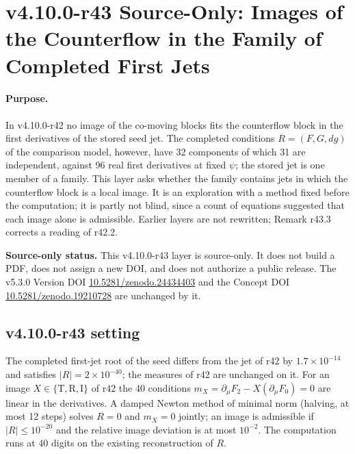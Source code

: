 \clearpage
\section*{v4.10.0-r43 Source-Only: Images of the Counterflow in the Family of Completed First Jets}
\label{sec:v4100-r43-jet-family}

\paragraph{Purpose.}
In v4.10.0-r42 no image of the co-moving blocks fits the counterflow block in the first derivatives of the stored seed jet.  The completed
conditions \(R=(F,G,dg)\) of the comparison model, however, have 32 components of which 31 are independent, against 96 real first derivatives at
fixed \(\psi\); the stored jet is one member of a family.  This layer asks whether the family contains jets in which the counterflow block is a
local image.  It is an exploration with a method fixed before the computation; it is partly not blind, since a count of equations suggested
that each image alone is admissible.  Earlier layers are not rewritten; Remark r43.3 corrects a reading of r42.2.

\noindent\textbf{Source-only status.}
This v4.10.0-r43 layer is source-only.  It does not build a PDF, does not assign a new DOI,
and does not authorize a public release.  The v5.3.0 Version DOI
\href{https://doi.org/10.5281/zenodo.24434403}{10.5281/zenodo.24434403} and the Concept DOI
\href{https://doi.org/10.5281/zenodo.19210728}{10.5281/zenodo.19210728} are unchanged by it.

\subsection*{v4.10.0-r43 setting}
\label{subsec:v4100-r43-setting}

The completed first-jet root of the seed differs from the jet of r42 by \(1.7\times10^{-14}\) and satisfies \(|R|=2\times10^{-40}\); the measures of r42 are
unchanged on it.  For an image \(X\in\{\mathrm T,\mathrm R,\mathrm I\}\) of r42 the 40 conditions \(m_X=\partial_\mu F_2-X(\partial_\mu F_0)=0\) are linear in the derivatives.
A damped Newton method of minimal norm (halving, at most 12 steps) solves \(R=0\) and \(m_X=0\) jointly; an image is admissible if \(|R|\le10^{-20}\) and
the relative image deviation is at most \(10^{-2}\).  The computation runs at 40 digits on the existing reconstruction of \(R\).

